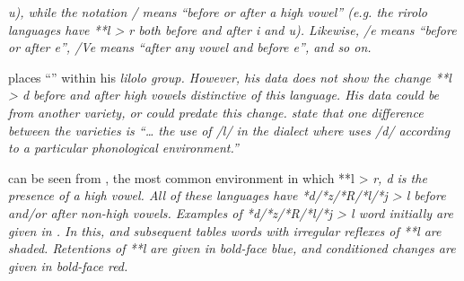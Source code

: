 \begin{table}
\begin{threeparttable}
\begin{tablenotes}
{								\it{u}), while the notation /\tsc{[+high]} means
								“before or after a high vowel” (e.g.
								the \it{rirolo} languages have **l > \it{r} both before
								and after \it{i} and \it{u}).
								Likewise, /e means “before or after \it{e}”,
								/V{\gap}e means “after any vowel
								and before \it{e}”, and so on.}
			\item[‡] {\citet[24]{Stresemann1927} places “” within his \it{lilolo} group.
								However, his data does not show the change **l > \it{d} before
								and after high vowels distinctive of this language.
								His data could be from another variety,
								or could predate this change.
								\citet[1]{LaidigLaidig1991} state that one difference between
								the varieties is “{\ldots} the use of /l/ in the  dialect
								where  uses /d/ according to a particular phonological
								environment.”}
		\end{tablenotes}
	\end{threeparttable}
\end{table}

\newpage
{} can be seen from ,
the most common environment in which **l > \it{r,
d} is the presence of a high vowel.
All of these languages have *d/*z/*R/*l/*j > \it{l} before and/or after non-high vowels.
Examples of *d/*z/*R/*l/*j > \it{l} word initially are given in .
In this, and subsequent tables words with irregular reflexes
of **l are shaded.
Retentions of **l are given in bold-face blue,
and conditioned changes are given in bold-face red.

